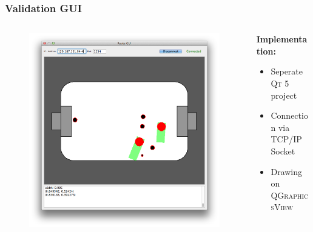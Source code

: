\documentclass[hyperref={pdfpagelabels=false},compress]{beamer}
\begin{document}
\begin{frame}
    \frametitle{Validation GUI}
    \begin{columns}[T]
        \begin{column}{0.4\textwidth}
            \begin{figure}
                \center
                \includegraphics[width=\textwidth]{Pictures/gui-small}
            \end{figure}
        \end{column}
        \begin{column}{0.6\textwidth}
            \textbf{Implementation:}
            \begin{itemize}
                \item Seperate \textsc{Qt 5} project
                \item Connection via TCP/IP Socket
                \item Drawing on \textsc{QGraphicsView}
            \end{itemize}
        \end{column}
    \end{columns}
\end{frame}
\end{document}
